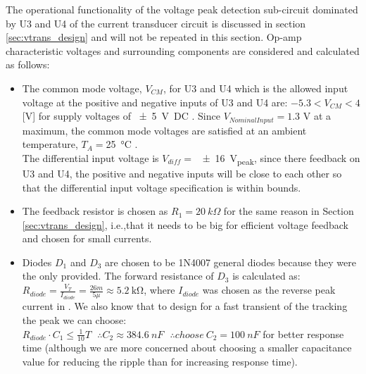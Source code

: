 The operational functionality of the voltage peak detection sub-circuit dominated by U3 and U4 of the current transducer circuit is discussed in section \ref{sec:vtrans_design} and will not be repeated in this section.
Op-amp characteristic voltages and surrounding components are considered and calculated as follows:
\begin{itemize}
 \item The common mode voltage, $V_{CM}$, for U3 and U4 which is the allowed input voltage at the positive and negative inputs of U3 and U4 are: $-5.3<V_{CM}<4$ [V] for supply voltages of \SI{+-5}{\volt DC} \cite{TLC2272}. Since $V_{Nominal Input}=1.3$ V at a maximum, the common mode voltages are satisfied at an ambient temperature, $T_A=$\SI{25}{\degreeCelsius} \cite{TLC2272}.\\The differential input voltage is $V_{diff}=$ \SI{+-16}{V_{peak}}, since there feedback on U3 and U4, the positive and negative inputs will be close to each other so that the differential input voltage specification is within bounds.
\item The feedback resistor is chosen as $R_1=20\ k\Omega$ for the same reason in Section \ref{sec:vtrans_design}, i.e.,that it needs to be big for efficient voltage feedback and chosen for small currents.
  \item Diodes $D_1$ and $D_3$ are chosen to be 1N4007 general diodes because they were the only provided. The forward resistance of $D_3$ is calculated as: $R_{diode}=\frac{V_T}{I_{diode}}=\frac{26m}{5\mu}\approx\SI{5.2}{\kilo\ohm}$, where $I_{diode}$ was chosen as the reverse peak current in
  \cite{1N4007}. We also know that to design for a fast transient of the tracking the peak we can choose\cite{voltage_peak_detector}: $R_{diode}\cdot C_1 \leq \frac{1}{10}T  \ \ \ \therefore C_2\approx384.6 \ nF \ \ \ \therefore choose \  C_2=100\ nF$ for better response time (although we are more concerned about choosing a smaller capacitance value for reducing the ripple than for increasing response time).
\end{itemize}


